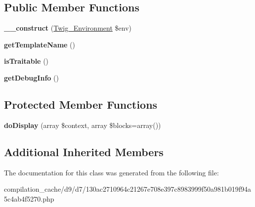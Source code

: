 \subsection*{Public Member Functions}
\begin{DoxyCompactItemize}
\item 
\hypertarget{class_____twig_template__d9d7130ac2710964c21267e708e397c8983999f50a981b019f94a5c4ab4f5270_a4f8326243132c1450a81e0a817aa1be7}{}{\bfseries \+\_\+\+\_\+construct} (\hyperlink{class_twig___environment}{Twig\+\_\+\+Environment} \$env)\label{class_____twig_template__d9d7130ac2710964c21267e708e397c8983999f50a981b019f94a5c4ab4f5270_a4f8326243132c1450a81e0a817aa1be7}

\item 
\hypertarget{class_____twig_template__d9d7130ac2710964c21267e708e397c8983999f50a981b019f94a5c4ab4f5270_a621a3ccd148ed8b9e937da6959c98f39}{}{\bfseries get\+Template\+Name} ()\label{class_____twig_template__d9d7130ac2710964c21267e708e397c8983999f50a981b019f94a5c4ab4f5270_a621a3ccd148ed8b9e937da6959c98f39}

\item 
\hypertarget{class_____twig_template__d9d7130ac2710964c21267e708e397c8983999f50a981b019f94a5c4ab4f5270_aa9eb89be270f6afc256ef5e272b78a63}{}{\bfseries is\+Traitable} ()\label{class_____twig_template__d9d7130ac2710964c21267e708e397c8983999f50a981b019f94a5c4ab4f5270_aa9eb89be270f6afc256ef5e272b78a63}

\item 
\hypertarget{class_____twig_template__d9d7130ac2710964c21267e708e397c8983999f50a981b019f94a5c4ab4f5270_abd0ecb0136f4228db2bd963bfc1e20d7}{}{\bfseries get\+Debug\+Info} ()\label{class_____twig_template__d9d7130ac2710964c21267e708e397c8983999f50a981b019f94a5c4ab4f5270_abd0ecb0136f4228db2bd963bfc1e20d7}

\end{DoxyCompactItemize}
\subsection*{Protected Member Functions}
\begin{DoxyCompactItemize}
\item 
\hypertarget{class_____twig_template__d9d7130ac2710964c21267e708e397c8983999f50a981b019f94a5c4ab4f5270_adb62b7c226e07d30f836ed16158d924f}{}{\bfseries do\+Display} (array \$context, array \$blocks=array())\label{class_____twig_template__d9d7130ac2710964c21267e708e397c8983999f50a981b019f94a5c4ab4f5270_adb62b7c226e07d30f836ed16158d924f}

\end{DoxyCompactItemize}
\subsection*{Additional Inherited Members}


The documentation for this class was generated from the following file\+:\begin{DoxyCompactItemize}
\item 
compilation\+\_\+cache/d9/d7/130ac2710964c21267e708e397c8983999f50a981b019f94a5c4ab4f5270.\+php\end{DoxyCompactItemize}
